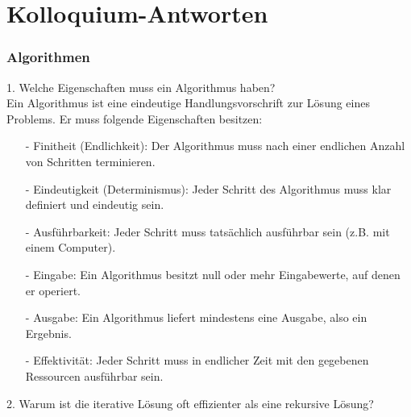 \documentclass[a4paper,12pt]{article}
\begin{document}
	
	
	\section*{Kolloquium-Antworten}
	\subsubsection*{Algorithmen}
	
	1. Welche Eigenschaften muss ein Algorithmus haben?\\
	Ein Algorithmus ist eine eindeutige Handlungsvorschrift zur Lösung eines Problems. Er muss folgende Eigenschaften besitzen:
	\begin{enumerate}		
		\item[-] Finitheit (Endlichkeit): Der Algorithmus muss nach einer endlichen Anzahl von Schritten terminieren.
		\item[-] Eindeutigkeit (Determinismus): Jeder Schritt des Algorithmus muss klar definiert und eindeutig sein.
		\item[-] Ausführbarkeit: Jeder Schritt muss tatsächlich ausführbar sein (z.B. mit einem Computer).
		\item[-] Eingabe: Ein Algorithmus besitzt null oder mehr Eingabewerte, auf denen er operiert.
		\item[-] Ausgabe: Ein Algorithmus liefert mindestens eine Ausgabe, also ein Ergebnis.
		\item[-] Effektivität: Jeder Schritt muss in endlicher Zeit mit den gegebenen Ressourcen ausführbar sein.
	\end{enumerate}
	2. Warum ist die iterative Lösung oft effizienter als eine rekursive Lösung?\\
\end{document}
